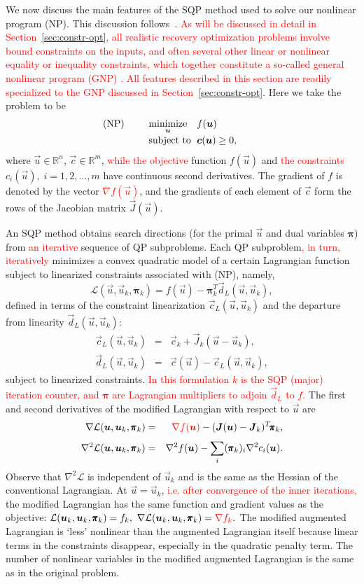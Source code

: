 \documentclass[twocolumn,numbook]{svjour3}          %
\makeatletter
\newcommand{\red}[1]{\textcolor{red}{#1}}
\def\u{{\vec u}}
\def\c{{\vec c}}
\def\d{{\vec d}}
\def\g{{\vec{G}}}
\def\bpi{{\pmb{\pi}}}%
\def\J{{\vec J}}
\def\disp{\displaystyle}
\def\grad{\nabla}
\def\Hess{\nabla^2}
\def\minim{\mathop{\hbox{\rm minimize}}}
\def\minimize#1{{\displaystyle\minim_{#1}}}
\def\Lscr{{\mathcal L}}
\def\subject{\mbox{\rm subject to}}
\def\T{^T\!}
\def\fk{f_k}
\def\ck{\c_k}
\def\Jk{\J_k}
\def\cL{\c_{\scriptscriptstyle L}} %
\def\dL{\d_{\scriptscriptstyle L}} %
\def\problem#1#2#3#4{%
   {\begin{tabular*}{0.47\textwidth}
    {@{}l@{\extracolsep{\fill}}l@{\extracolsep{6pt}}l@{\extracolsep{\fill}}c@{}}
      #1 & $\minimize{#2}$ & $#3$ & $ $ \\[5pt]
         & $\subject$      & $#4$ & $ $
    \end{tabular*}}}
\makeatother
\begin{document}

We now discuss the main features of the SQP method used to solve our
nonlinear program (NP). This discussion follows~\cite{SNOPT}. \red{As will be discussed in detail in Section~\ref{sec:constr-opt}, all realistic recovery optimization problems involve bound constraints on the inputs, and often several other linear or nonlinear equality or inequality constraints, which together constitute a so-called general nonlinear program (GNP) . All features described in this section are readily specialized to the GNP discussed in Section~\ref{sec:constr-opt}}. Here we take the problem to be
$$
   \problem{(NP)}{\u}{f(\u)}{\c(\u) \ge 0,}
$$
where $\u \in \mathbb R^n$, $\c \in \mathbb R^m$, \red{while the objective} function $f(\u)$ and \red{the constraints} $c_i(\u), \; i=1,2,\ldots,m$
have continuous second derivatives. The gradient of $f$ is denoted
by the vector 
\red{$ \grad f(\u)$}, 
and the gradients of each element of $\c$ form
the rows of the Jacobian matrix $\J(\u)$.

 An SQP method obtains search directions (for the primal $\u$ and dual variables $\bpi$) from \red{an iterative} sequence of QP subproblems.  
 Each QP subproblem\red{, in turn, iteratively} minimizes a convex quadratic
model of a certain Lagrangian function subject to
linearized constraints associated with (NP), namely,
\begin{equation}                                 \label{eqn-def-ML}
        \Lscr(\u,\u_k,\bpi_k) = f(\u) - \bpi_k^T \dL(\u,\u_k),
\end{equation}
defined in terms of the constraint linearization $\cL(\u,\u_k)$
and the departure from linearity $\dL(\u,\u_k)$:
\begin{eqnarray*}
        \cL(\u,\u_k) &=& \ck  + \Jk(\u - \u_k),
     \\ \dL(\u,\u_k) &=& \c(\u) - \cL(\u,\u_k),
\end{eqnarray*}
subject to linearized constraints. \red{In this formulation $k$ is the SQP (major) iteration counter, and $\bpi$ are Lagrangian multipliers to adjoin $\dL$ to $f$.} 
The first and second derivatives of the modified Lagrangian with
respect to $\u$ are
\begin{eqnarray*}
        \grad\Lscr(\u,\u_k,\bpi_k) &=& \red{\grad f(\u)} - (\J(\u) - \Jk)\T \bpi_k, \\[3pt]
        \Hess\Lscr(\u,\u_k,\bpi_k) &=& \disp \Hess f(\u)
                                           - \sum_i (\bpi_k)_i \Hess c_i(\u).
\end{eqnarray*}
Observe that $\Hess\Lscr$ is independent of $\u_k$
and is the same as the Hessian of the conventional Lagrangian.
At $\u = \u_k$, \red{i.e. after convergence of the inner iterations,} the modified Lagrangian has the same function and
gradient values as the objective:
$
           \Lscr(\u_k,\u_k,\bpi_k) = \fk, \ %
     \grad \Lscr(\u_k,\u_k,\bpi_k) =\red{ \grad \fk}.
$
The modified augmented Lagrangian is `less' nonlinear than the augmented Lagrangian itself
because linear terms in the constraints disappear, especially in the quadratic penalty term.
The number of nonlinear variables in the modified augmented Lagrangian is the same as in the original problem.
\end{document}
